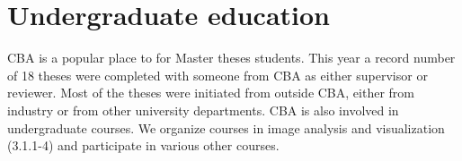 \section{Undergraduate education}

{\large
CBA is a popular place to for Master theses students. This year a record number of 18 theses were completed with someone from CBA as either supervisor or reviewer. Most of the theses were initiated from outside CBA, either from industry or from other university departments. CBA is also involved in undergraduate courses. We organize courses in image analysis and visualization (3.1.1-4) and participate in various other courses. 
%
%

}



